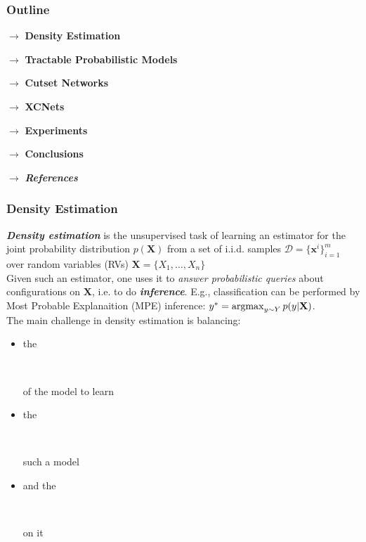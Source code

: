 \documentclass[xcolor={usenames,dvipsnames,svgnames}, compress]{beamer}
\newcommand{\argmax}{\operatornamewithlimits{argmax}}
\newcommand{\highlighttext}[2][yellow]{{\colorbox{#1}{\strut\textcolor{white}{#2}}}}
\begin{document}
{
  \begin{frame}
    \titlepage
  \end{frame}
}

\begin{frame}[t]
  \frametitle{Outline}
  \bigskip
  $\rightarrow$ \textcolor{lacamlightlilac}{\large\textbf{Density Estimation}}\par
  \bigskip
  $\rightarrow$ \textcolor{lacamlightlilac}{\large\textbf{Tractable
      Probabilistic Models}}\par
  \bigskip
  $\rightarrow$ \textcolor{lacamlightlilac}{\large\textbf{Cutset Networks}}\par
  \bigskip
  $\rightarrow$ \textcolor{lacamlightlilac}{\large\textbf{XCNets}}\par
  \bigskip
  $\rightarrow$ \textcolor{lacamlightlilac}{\large\textbf{Experiments}}\par
  \bigskip
  $\rightarrow$ \textcolor{lacamlightlilac}{\large\textbf{Conclusions}}\par
  \bigskip
  $\rightarrow$ \textcolor{lacamlightlilac}{\large\textbf{\emph{References}}}\par
\end{frame}


\begin{frame}[t]
  \frametitle{Density Estimation}
  \small
  \emph{\textbf{Density estimation}} is the unsupervised task of
    learning an estimator for the joint probability distribution
    $p(\mathbf{X})$ from a set of i.i.d. samples $\mathcal{D}=\{\mathbf
    x^i\}_{i=1}^m$ over random variables (RVs) $\mathbf{X}=\{X_{1},\dots,X_{n}\}$\\[17pt]
    
    Given such an estimator, one uses it to \emph{answer
    probabilistic queries} about configurations on $\mathbf{X}$,
  i.e. to do \emph{\textbf{inference}}.
  E.g., classification can be performed by Most Probable Explanaition
  (MPE) inference: $y^{*}=\argmax_{y\sim Y}p(y|\mathbf{X})$.
  \\[17pt]

    The main challenge in density estimation is balancing:
    \begin{itemize}
      \setlength\itemsep{-3pt}
    \item the \highlighttext[lacamlilac]{\textbf{\emph{representation
            expressiveness}}} of the model to learn
    \item the \highlighttext[gold4]{\textbf{\emph{cost of learning}}}
      such a model
      \item and the \highlighttext[petroil2]{\textbf{\emph{cost of performing inference}}} on it
    \end{itemize}

\end{frame}
\end{document}
